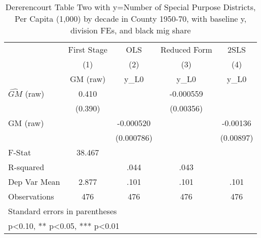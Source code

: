 \begin{table}[htbp]\centering
\def\sym#1{\ifmmode^{#1}\else\(^{#1}\)\fi}
\caption{Dererencourt Table Two with y=Number of Special Purpose Districts, Per Capita (1,000) by decade in County 1950-70, with baseline y, division FEs, and black mig share}
\begin{tabular}{l*{4}{c}}
\toprule
                    & First Stage   &         OLS   &Reduced Form   &        2SLS   \\
                    &\multicolumn{1}{c}{(1)}&\multicolumn{1}{c}{(2)}&\multicolumn{1}{c}{(3)}&\multicolumn{1}{c}{(4)}\\
                    &\multicolumn{1}{c}{GM  (raw)}&\multicolumn{1}{c}{y\_L0}&\multicolumn{1}{c}{y\_L0}&\multicolumn{1}{c}{y\_L0}\\
\midrule
$\hat{GM}$ (raw)    &       0.410   &               &   -0.000559   &               \\
                    &     (0.390)   &               &   (0.00356)   &               \\
\addlinespace
GM  (raw)           &               &   -0.000520   &               &    -0.00136   \\
                    &               &  (0.000786)   &               &   (0.00897)   \\
\midrule
F-Stat              &      38.467   &               &               &               \\
R-squared           &               &        .044   &        .043   &               \\
Dep Var Mean        &       2.877   &        .101   &        .101   &        .101   \\
Observations        &         476   &         476   &         476   &         476   \\
\bottomrule
\multicolumn{5}{l}{\footnotesize Standard errors in parentheses}\\
\multicolumn{5}{l}{\footnotesize * p<0.10, ** p<0.05, *** p<0.01}\\
\end{tabular}
\end{table}
